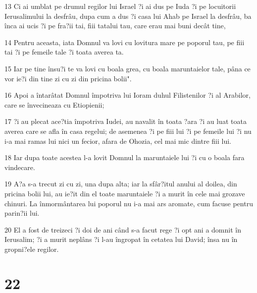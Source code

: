 \par 13 Ci ai umblat pe drumul regilor lui Israel ?i ai dus pe Iuda ?i pe locuitorii Ierusalimului la desfrâu, dupa cum a dus ?i casa lui Ahab pe Israel la desfrâu, ba înca ai ucis ?i pe fra?ii tai, fiii tatalui tau, care erau mai buni decât tine,
\par 14 Pentru aceasta, iata Domnul va lovi cu lovitura mare pe poporul tau, pe fiii tai ?i pe femeile tale ?i toata averea ta.
\par 15 Iar pe tine însu?i te va lovi cu boala grea, cu boala maruntaielor tale, pâna ce vor ie?i din tine zi cu zi din pricina bolii".
\par 16 Apoi a întarâtat Domnul împotriva lui Ioram duhul Filistenilor ?i al Arabilor, care se învecineaza cu Etiopienii;
\par 17 ?i au plecat ace?tia împotriva Iudei, au navalit în toata ?ara ?i au luat toata averea care se afla în casa regelui; de asemenea ?i pe fiii lui ?i pe femeile lui ?i nu i-a mai ramas lui nici un fecior, afara de Ohozia, cel mai mic dintre fiii lui.
\par 18 Iar dupa toate acestea l-a lovit Domnul la maruntaiele lui ?i cu o boala fara vindecare.
\par 19 A?a s-a trecut zi cu zi, una dupa alta; iar la sfâr?itul anului al doilea, din pricina bolii lui, au ie?it din el toate maruntaiele ?i a murit în cele mai grozave chinuri. La înmormântarea lui poporul nu i-a mai ars aromate, cum facuse pentru parin?ii lui.
\par 20 El a fost de treizeci ?i doi de ani când s-a facut rege ?i opt ani a domnit în Ierusalim; ?i a murit neplâns ?i l-au îngropat în cetatea lui David; însa nu în gropni?ele regilor.

\chapter{22}


